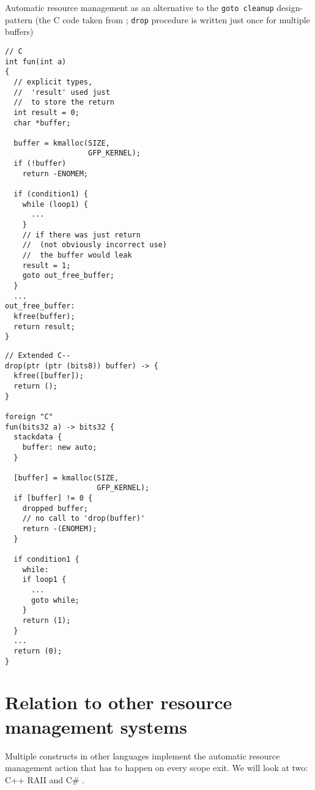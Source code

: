\begin{codex}
  \caption{Automatic resource management as an alternative to the \texttt{goto cleanup} design-pattern (the C code taken from  \cite{kernelStyle}; \texttt{drop} procedure is written just once for multiple buffers)}
  \label{cex:cleanup}
  \begin{minipage}{0.5\linewidth}
    \begin{lstlisting}[basicstyle=\scriptsize\ttfamily]
// C
int fun(int a)
{
  // explicit types,
  //  'result' used just
  //  to store the return
  int result = 0;
  char *buffer;

  buffer = kmalloc(SIZE,
                   GFP_KERNEL);
  if (!buffer)
    return -ENOMEM;

  if (condition1) {
    while (loop1) {
      ...
    }
    // if there was just return
    //  (not obviously incorrect use)
    //  the buffer would leak
    result = 1;
    goto out_free_buffer;
  }
  ...
out_free_buffer:
  kfree(buffer);
  return result;
}
    \end{lstlisting}
  \end{minipage}%
  \begin{minipage}{0.5\linewidth}
    \begin{lstlisting}[basicstyle=\scriptsize\ttfamily]
// Extended C--
drop(ptr (ptr (bits8)) buffer) -> {
  kfree([buffer]);
  return ();
}

foreign "C"
fun(bits32 a) -> bits32 {
  stackdata {
    buffer: new auto;
  }

  [buffer] = kmalloc(SIZE,
                     GFP_KERNEL);
  if [buffer] != 0 {
    dropped buffer;
    // no call to 'drop(buffer)'
    return -(ENOMEM);
  }

  if condition1 {
    while:
    if loop1 {
      ...
      goto while;
    }
    return (1);
  }
  ...
  return (0);
}
    \end{lstlisting}
  \end{minipage}%
\end{codex}

\section{Relation to other resource management systems}
\label{sec:OtherRAII}

Multiple constructs in other languages implement the automatic resource management action that has to happen on every scope exit. We will look at two: C++ RAII and C\# .


